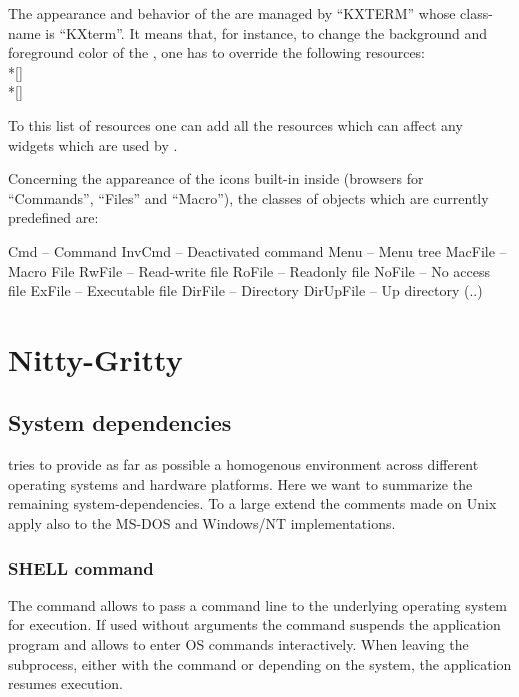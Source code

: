 The appearance and behavior of the \EW{} are managed by ``KXTERM'' whose
class-name is ``KXterm''. It means that, for instance, to change the
background and foreground color of the \EW{}, one has to override the
following resources:
\\*[\smallskipamount]\mbox{}
\\*[\smallskipamount]\mbox{}

To this list of resources one can add all the resources which can affect
any \Motif{} widgets which are used by \KUIPMotif{}.

Concerning the appareance of the icons built-in inside \KUIPMotif{} (browsers 
for ``Commands'', ``Files'' and ``Macro''), the classes of objects which are 
currently predefined are:
\begin{XMP}
    Cmd        -- Command
    InvCmd     -- Deactivated command
    Menu       -- Menu tree
    MacFile    -- Macro File
    RwFile     -- Read-write file
    RoFile     -- Readonly file
    NoFile     -- No access file
    ExFile     -- Executable file
    DirFile    -- Directory
    DirUpFile  -- Up directory (..)
\end{XMP}


\section{Nitty-Gritty}

\subsection{System dependencies}

\KUIP{} tries to provide as far as possible a homogenous environment
across different operating systems and hardware platforms.
Here we want to summarize the remaining system-dependencies.
To a large extend the comments made on Unix apply also to the MS-DOS
and Windows/NT implementations.


\subsubsection{SHELL command}

The  command allows to pass a command line to the
underlying operating system for execution.
If used without arguments the  command suspends the
application program and allows to enter OS commands interactively.
When leaving the subprocess, either with the command  or
 depending on the system, the application resumes execution.

